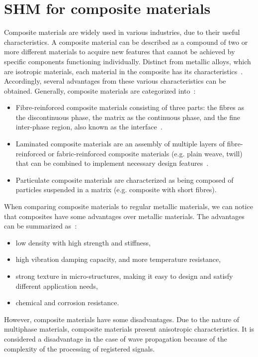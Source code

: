 \section[SHM for composite materials]{SHM for composite materials}
\label{sec21}
Composite materials are widely used in various industries, due to their useful character\-istics. 
A composite material can be described as a compound of two or more different materials to acquire new features that cannot be achieved by specific components functioning individually.
Distinct from metallic alloys, which are isotropic materials, each material in the composite has its characteristics~\cite{Campbell2010}.
Accordingly, several advantages from these various characteristics can be obtained.
Generally, composite materials are categorized into~\cite{Jones1999}:
\begin{itemize}
	\item Fibre-reinforced composite materials consisting of three parts: the fibres as the discontinuous phase, the matrix as the continuous phase, and the fine inter-phase region, also known as the interface~\cite{Cantwell1991}.
	\item Laminated composite materials are an assembly of multiple layers of fibre-reinforc\-ed or fabric-reinforced composite materials (e.g. plain weave, twill) that can be combined to implement necessary design features~\cite{Ramirez1999}.
	\item Particulate composite materials are characterized as being composed of particles suspended in a matrix (e.g. composite with short fibres).
\end{itemize}

When comparing composite materials to regular metallic materials, we can notice that composites have some advantages over metallic materials. 
The advantages can be summarized as~\cite{Campbell2010}:
\begin{itemize}
	\item low density with high strength and stiffness,
	\item high vibration damping capacity, and more temperature resistance,
	\item strong texture in micro-structures, making it easy to design and satisfy different application needs, 
	\item chemical and corrosion resistance.	
\end{itemize}

However, composite materials have some disadvantages.
Due to the nature of multiphase materials, composite materials present anisotropic characteristics.
It is considered a disadvantage in the case of wave propagation because of the complexity of the processing of registered signals.

